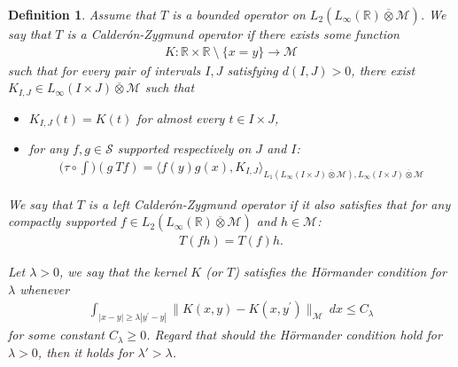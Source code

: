 \documentclass[psamsfonts]{amsart}
\newtheorem{definition}[theorem]{Definition}
\newcommand{\Lone}{L_1}
\newcommand{\Linfty}{L_\infty}
\newcommand{\Ltwo}{L_2}
\newcommand{\Avnat}{\Linfty(\mathbb{R}) \overline{\otimes} \mathcal{M}}
\begin{document}
      
    \begin{definition}\label{def:CZ}
        Assume that $T$ is a bounded operator on $\Ltwo(\Linfty(\mathbb{R}) {\overline{\otimes}} \mathcal{M})$. We say that $T$ is a \emph{Calder\'on-Zygmund operator} if there exists some function
        \begin{align*}
            K : \mathbb{R} \times \mathbb{R} \ \setminus \ \{x=y\} \longrightarrow \mathcal{M}
        \end{align*}
        such that for every pair of intervals $I,J$ satisfying $d(I,J) > 0$, there exist $K_{I,J} \in \Linfty(I \times J) \overline{\otimes} \mathcal{M}$ such that
        \begin{itemize}
          \item ${K}_{I,J}(t) = K(t)$ for  almost every $t \in I \times J$,
 \item   for any $f,g \in \mathcal S$ supported respectively on $J$ and $I$:  \begin{align}\label{dissup}
            \Big(\tau \circ \int\Big)(g \ Tf) = \langle f(y)g(x), K_{I,J} \rangle_{\Lone(\Linfty(I\times J)\overline{\otimes} \mathcal{M}),\Linfty(I \times J)\overline{\otimes} \mathcal{M}}
        \end{align}
      \end{itemize}
      
        We say that $T$ is a \emph{left Calder\'on-Zygmund operator} if it also  satisfies that for any compactly supported $f \in \Ltwo(\Avnat)$ and $h \in \mathcal{M}$:
        \begin{align*}
            T(fh) = T(f)h. 
        \end{align*}

      
       Let $\lambda>0$, we say that the kernel $K$ (or $T$) satisfies the \emph{Hörmander condition} for $\lambda$ whenever
        \begin{align}\label{eq:hormanderCondition}
            \int_{|x-y| \geq \lambda |y^\prime-y|} \|K(x,y) - K(x,y^\prime)\|_{\mathcal{M}} \ dx \leq C_\lambda
        \end{align}
        for some constant $C_\lambda \geq 0$.  Regard that should the Hörmander condition hold for $\lambda > 0$, then it holds for $\lambda' > \lambda$.
    \end{definition}
\end{document}
